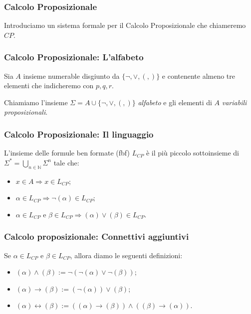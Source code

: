 \documentclass[notheorem,aspectratio=169]{beamer}
\begin{document}
\begin{frame}
\frametitle{Calcolo Proposizionale}
Introduciamo un sistema formale per il Calcolo Proposizionale
che chiameremo $CP$.
\end{frame}
\begin{frame}
\frametitle{Calcolo Proposizionale: L'alfabeto}
Sia $A$ insieme numerable disgiunto da $\{\neg, \lor, (, )\}$ e contenente
almeno tre elementi che indicheremo con $p, q, r$.

Chiamiamo l'insieme $\Sigma = A \cup \{\neg, \lor, (, )\}$ \emph{alfabeto}
e gli elementi di $A$ \emph{variabili proposizionali}.
\end{frame}
\begin{frame}
\frametitle{Calcolo Proposizionale: Il linguaggio}
L'insieme delle formule ben formate (fbf) $L_{CP}$ è il più piccolo sottoinsieme di
$\Sigma^{*} = \bigcup_{n \in \mathbb{N}} \Sigma^n$ tale che:
\begin{itemize}
\item $x \in A \Rightarrow x \in L_{CP}$;
\item $\alpha \in L_{CP} \Rightarrow \neg (\alpha) \in L_{CP}$;
\item $\alpha \in L_{CP}$ e $\beta \in L_{CP} \Rightarrow (\alpha) \lor (\beta) \in L_{CP}$.
\end{itemize}
\end{frame}
\begin{frame}
\frametitle{Calcolo proposizionale: Connettivi aggiuntivi}
Se $\alpha \in L_{CP}$ e $\beta \in L_{CP}$, allora diamo le seguenti definizioni:
\begin{itemize}
\item $(\alpha) \land (\beta) := \neg(\neg(\alpha) \lor \neg(\beta))$;
\item $(\alpha) \rightarrow (\beta) := (\neg(\alpha)) \lor (\beta)$;
\item $(\alpha) \leftrightarrow (\beta) := ((\alpha) \rightarrow (\beta)) \land ((\beta) \rightarrow (\alpha))$.
\end{itemize}
\end{frame}
\end{document}
